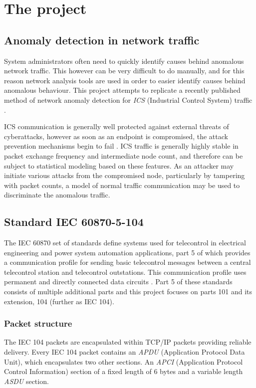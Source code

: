 \newcommand{\code}{\texttt}
\renewcommand\theadalign{bc}
\renewcommand\theadfont{\bfseries}
\renewcommand\theadgape{\Gape[4pt]}
\renewcommand\cellgape{\Gape[4pt]}

\chapter{The project}
\section{Anomaly detection in network traffic}
System administrators often need to quickly identify causes behind anomalous network traffic. This however can be very difficult to do manually,
and for this reason network analysis tools are used in order to easier identify causes behind anomalous behaviour. This project attempts to replicate
a recently published method of network anomaly detection for \emph{ICS} (Industrial Control System) traffic \cite{burgetova_anomaly}.

ICS communication is generally well protected against external threats of cyberattacks, however as soon as an endpoint is compromised,
the attack prevention mechanisms begin to fail \cite{burgetova_anomaly}. ICS traffic is generally highly stable in packet exchange frequency and
intermediate node count, and therefore can be subject to statistical modeling based on these features.
As an attacker may initiate various attacks from the compromised node, particularly by tampering with packet counts, a model of normal traffic communication
may be used to discriminate the anomalous traffic.


\section{Standard IEC 60870-5-104}
The IEC 60870 set of standards define systems used for telecontrol in electrical engineering and power system automation applications,
part 5 of which provides a communication profile for sending basic telecontrol messages between a central telecontrol station and telecontrol outstations.
This communication profile uses permanent and directly connected data circuits \cite{IEC104}. Part 5 of these standards consists of multiple
additional parts and this project focuses on parts 101 and its extension, 104 (further as IEC 104).

\subsection{Packet structure}
The IEC 104 packets are encapsulated within TCP/IP packets providing reliable delivery. Every IEC 104 packet
contains an \emph{APDU} (Application Protocol Data Unit), which encapsulates two other sections.
An \emph{APCI} (Application Protocol Control Information) section of a fixed length of 6 bytes and a variable length \emph{ASDU} section.

